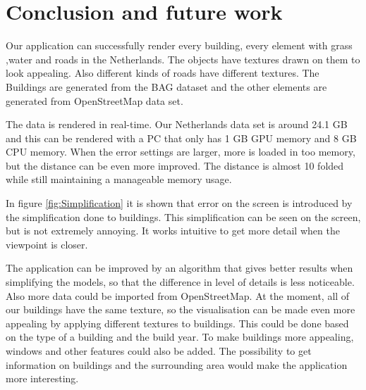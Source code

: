\chapter{Conclusion and future work}
\label{chap:ConclusionAndFutureWork}
Our application can successfully render every building, every element with grass ,water and roads in the Netherlands. The objects have textures drawn on them to look appealing. Also different kinds of roads have different textures. The Buildings are generated from the BAG dataset and the other elements are generated from OpenStreetMap data set.

The data is rendered in real-time. Our Netherlands data set is around 24.1 GB and this can be rendered with a PC that only has 1 GB GPU memory and 8 GB CPU memory. When the error settings are larger, more is loaded in too memory, but the distance can be even more improved. The distance is almost 10 folded while still maintaining a manageable memory usage.

In figure \ref{fig:Simplification} it is shown that error on the screen is introduced by the simplification done to buildings. This simplification can be seen on the screen, but is not extremely annoying. It works intuitive to get more detail when the viewpoint is closer.

The application can be improved by an algorithm that gives better results when simplifying the models, so that the difference in level of details is less noticeable. Also more data could be imported from OpenStreetMap. At the moment, all of our buildings have the same texture, so the visualisation can be made even more appealing by applying different textures to buildings. This could be done based on the type of a building and the build year. To make buildings more appealing, windows and other features could also be added. The possibility to get information on buildings and the surrounding area would make the application more interesting.

